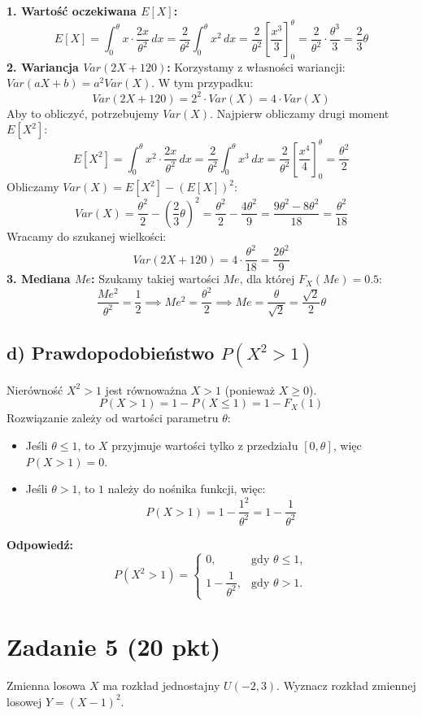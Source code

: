 \documentclass[polish, 10pt]{extarticle}
\begin{document}
\textbf{1. Wartość oczekiwana $E[X]$:}
\[
E[X] = \int_0^\theta x \cdot \frac{2x}{\theta^2} \, dx = \frac{2}{\theta^2} \int_0^\theta x^2 \, dx = \frac{2}{\theta^2} \left[ \frac{x^3}{3} \right]_0^\theta = \frac{2}{\theta^2} \cdot \frac{\theta^3}{3} = \frac{2}{3}\theta
\]
\textbf{2. Wariancja $Var(2X + 120)$:}
Korzystamy z własności wariancji: $Var(aX + b) = a^2 Var(X)$. W tym przypadku:
\[
Var(2X + 120) = 2^2 \cdot Var(X) = 4 \cdot Var(X)
\]
Aby to obliczyć, potrzebujemy $Var(X)$. Najpierw obliczamy drugi moment $E[X^2]$:
\[
E[X^2] = \int_0^\theta x^2 \cdot \frac{2x}{\theta^2} \, dx = \frac{2}{\theta^2} \int_0^\theta x^3 \, dx = \frac{2}{\theta^2} \left[ \frac{x^4}{4} \right]_0^\theta = \frac{\theta^2}{2}
\]
Obliczamy $Var(X) = E[X^2] - (E[X])^2$:
\[
Var(X) = \frac{\theta^2}{2} - \left(\frac{2}{3}\theta\right)^2 = \frac{\theta^2}{2} - \frac{4\theta^2}{9} = \frac{9\theta^2 - 8\theta^2}{18} = \frac{\theta^2}{18}
\]
Wracamy do szukanej wielkości:
\[
Var(2X + 120) = 4 \cdot \frac{\theta^2}{18} = \frac{2\theta^2}{9}
\]
\textbf{3. Mediana $Me$:}
Szukamy takiej wartości $Me$, dla której $F_X(Me) = 0.5$:
\[
\frac{Me^2}{\theta^2} = \frac{1}{2} \implies Me^2 = \frac{\theta^2}{2} \implies Me = \frac{\theta}{\sqrt{2}} = \frac{\sqrt{2}}{2}\theta
\]

\subsection*{d) Prawdopodobieństwo $P(X^2 > 1)$}
Nierówność $X^2 > 1$ jest równoważna $X > 1$ (ponieważ $X \ge 0$).
\[
P(X > 1) = 1 - P(X \leq 1) = 1 - F_X(1)
\]
Rozwiązanie zależy od wartości parametru $\theta$:
\begin{itemize}
    \item Jeśli $\theta \leq 1$, to $X$ przyjmuje wartości tylko z przedziału $[0, \theta]$, więc $P(X > 1) = 0$.
    \item Jeśli $\theta > 1$, to $1$ należy do nośnika funkcji, więc:
    \[
    P(X > 1) = 1 - \frac{1^2}{\theta^2} = 1 - \frac{1}{\theta^2}
    \]
\end{itemize}

\noindent \textbf{Odpowiedź:}
\[
P(X^2 > 1) =
\begin{cases}
0, & \text{gdy } \theta \leq 1, \\[6pt]
1 - \dfrac{1}{\theta^2}, & \text{gdy } \theta > 1.
\end{cases}
\]

\section*{Zadanie 5 (20 pkt)}
Zmienna losowa $X$ ma rozkład jednostajny $U(-2, 3)$.
Wyznacz rozkład zmiennej losowej $Y = (X-1)^2$.
\end{document}
